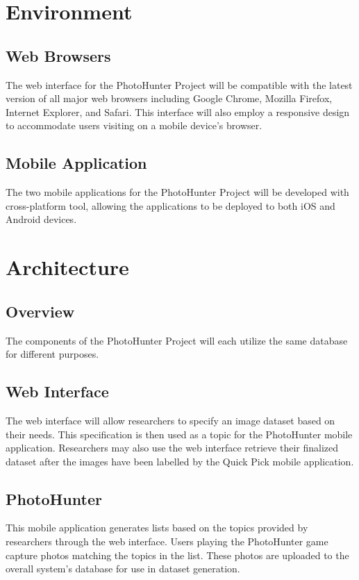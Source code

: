 \documentclass{article}
\begin{document}
\section{Environment}
\subsection{Web Browsers}
The web interface for the PhotoHunter Project will be compatible with the
latest version of all major web browsers including Google Chrome, Mozilla
Firefox, Internet Explorer, and Safari. This interface will also employ a
responsive design to accommodate users visiting on a mobile device's browser.

\subsection{Mobile Application}
The two mobile applications for the PhotoHunter Project will be developed with
cross-platform tool, allowing the applications to be deployed to both iOS and
Android devices. 

\section{Architecture}

\subsection{Overview}
The components of the PhotoHunter Project will each utilize the same database
for different purposes.

\subsection{Web Interface}
The web interface will allow researchers to specify an image dataset based on
their needs. This specification is then used as a topic for the PhotoHunter
mobile application. Researchers may also use the web interface retrieve their
finalized dataset after the images have been labelled by the Quick Pick mobile
application. 

\subsection{PhotoHunter}
This mobile application generates lists based on the topics provided by
researchers through the web interface. Users playing the PhotoHunter game
capture photos matching the topics in the list. These photos are uploaded to
the overall system's database for use in dataset generation.
\end{document}
